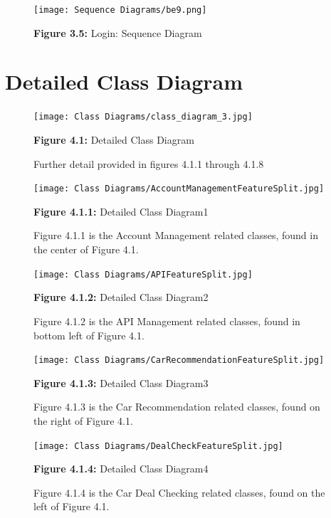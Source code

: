 \documentclass[]{article}
\begin{document}
\begin{figure}[H]
  \centering
  \texttt{[image: Sequence Diagrams/be9.png]}
  
  \textbf{Figure 3.5:} Login: Sequence Diagram\label{Fig:3.5}
\end{figure}


\section{Detailed Class Diagram}
\label{sec:detailed_class_diagram}

\begin{figure}[H]
  \centering
  \texttt{[image: Class Diagrams/class\_diagram\_3.jpg]}
  
  \textbf{Figure 4.1:} Detailed Class Diagram \label{Fig:4.1}

  Further detail provided in figures 4.1.1 through 4.1.8
\end{figure}

\begin{figure}[H]
  \centering
  \texttt{[image: Class Diagrams/AccountManagementFeatureSplit.jpg]}
  
  \textbf{Figure 4.1.1:} Detailed Class Diagram1 \label{Fig:4.1.1}

  Figure 4.1.1 is the Account Management related classes, found in the center of Figure 4.1.
\end{figure}

\begin{figure}[H]
  \centering
  \texttt{[image: Class Diagrams/APIFeatureSplit.jpg]}
  
  \textbf{Figure 4.1.2:} Detailed Class Diagram2 \label{Fig:4.1.2}

  Figure 4.1.2 is the API Management related classes, found in bottom left of Figure 4.1.
\end{figure}

\begin{figure}[H]
  \centering
  \texttt{[image: Class Diagrams/CarRecommendationFeatureSplit.jpg]}
  
  \textbf{Figure 4.1.3:} Detailed Class Diagram3 \label{Fig:4.1.3}

  Figure 4.1.3 is the Car Recommendation related classes, found on the right of Figure 4.1.
\end{figure}

\begin{figure}[H]
  \centering
  \texttt{[image: Class Diagrams/DealCheckFeatureSplit.jpg]}
  
  \textbf{Figure 4.1.4:} Detailed Class Diagram4 \label{Fig:4.1.4}

  Figure 4.1.4 is the Car Deal Checking related classes, found on the left of Figure 4.1.
\end{figure}
\end{document}
